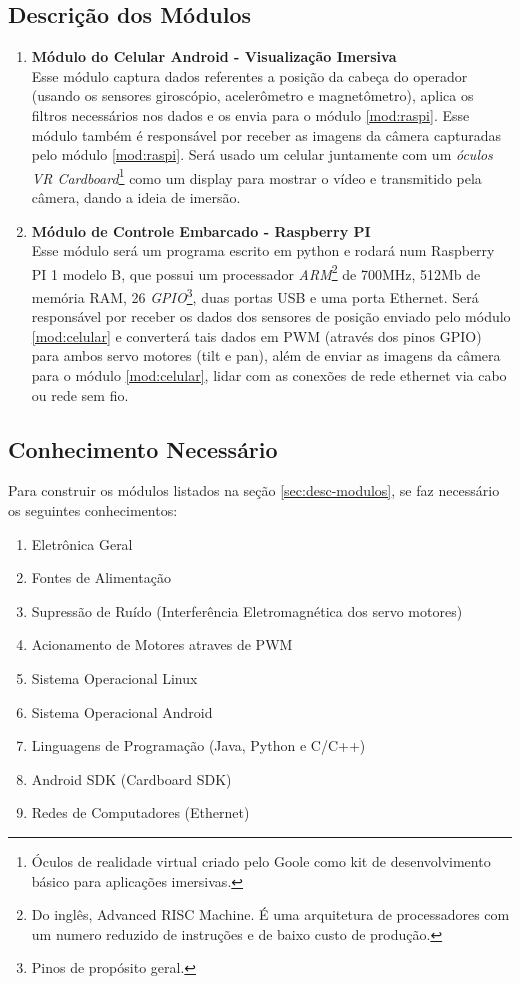 \documentclass[12pt,a4paper]{article}
\begin{document}
\subsection{Descrição dos Módulos \label{sec:desc-modulos}}
\begin{enumerate}
\item \textbf{Módulo do Celular Android - Visualização Imersiva\label{mod:celular}}\\
	Esse módulo captura dados referentes a posição da cabeça do operador (usando os sensores giroscópio, acelerômetro e magnetômetro), aplica os filtros necessários nos dados e os envia para o módulo \ref{mod:raspi}. Esse módulo também é responsável por receber as imagens da câmera capturadas pelo módulo \ref{mod:raspi}. Será usado um celular juntamente com um \emph{óculos VR Cardboard}\footnote{Óculos de realidade virtual criado pelo Goole como kit de desenvolvimento básico para aplicações imersivas.} como um display para mostrar o vídeo e transmitido pela câmera, dando a ideia de imersão.
\item \textbf{Módulo de Controle Embarcado - Raspberry PI\label{mod:raspi}}\\
	Esse módulo será um programa escrito em python e rodará num Raspberry PI 1 modelo B, que possui um processador \emph{ARM}\footnote{Do inglês, Advanced RISC Machine. É uma arquitetura de processadores com um numero reduzido de instruções e de baixo custo de produção.} de 700MHz, 512Mb de memória RAM, 26 \emph{GPIO}\footnote{Pinos de propósito geral.}, duas portas USB e uma porta Ethernet. Será responsável por receber os dados dos sensores de posição enviado pelo módulo \ref{mod:celular} e converterá tais dados em PWM (através dos pinos GPIO) para ambos servo motores (tilt e pan), além de enviar as imagens da câmera para o módulo \ref{mod:celular}, lidar com as conexões de rede ethernet via cabo ou rede sem fio.
\end{enumerate}

\subsection{Conhecimento Necessário}
	Para construir os módulos listados na seção \ref{sec:desc-modulos}, se faz necessário os seguintes conhecimentos:
\begin{enumerate}[noitemsep]
	\item Eletrônica Geral
	\item Fontes de Alimentação
	\item Supressão de Ruído (Interferência Eletromagnética dos servo motores)
	\item Acionamento de Motores atraves de PWM
	\item Sistema Operacional Linux
	\item Sistema Operacional Android
	\item Linguagens de Programação (Java, Python e C/C++)
	\item Android SDK (Cardboard SDK)
	\item Redes de Computadores (Ethernet)
\end{enumerate}
\end{document}
